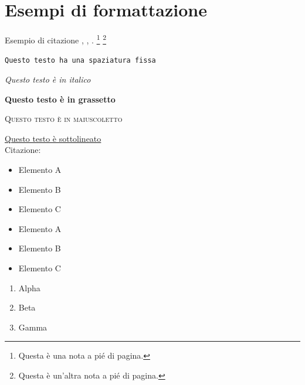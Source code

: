 
\section{Esempi di formattazione}

Esempio di citazione \cite{4538384}, \cite{5357331,4523385}, \cite{1705631}.
\footnote{Questa \`e una nota a pi\'e di pagina.}
\footnote{Questa \`e un'altra nota a pi\'e di pagina.}

\texttt{Questo testo ha una spaziatura fissa}

\textit{Questo testo \`e in italico}

\textbf{Questo testo \`e in grassetto}

\textsc{Questo testo \`e in maiuscoletto}

\underline{Questo testo \`e sottolineato} \\

Citazione:
\begin{quote}
\lipsum[11]
\end{quote}

\begin{itemize}
  \item Elemento A
  \item Elemento B
  \item Elemento C
\end{itemize}

\begin{itemize}
  \item[-] Elemento A
  \item[-] Elemento B
  \item[-] Elemento C
\end{itemize}

\begin{enumerate}
  \item Alpha
  \item Beta
  \item Gamma
\end{enumerate}
